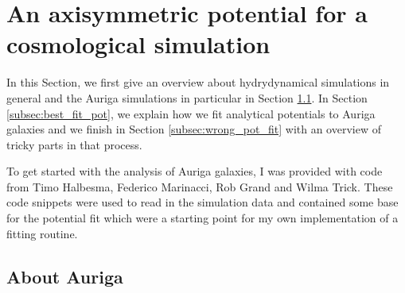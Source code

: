 \section{An axisymmetric potential for a cosmological simulation}\label{sec:Auriga}
In this Section, we first give an overview about hydrydynamical simulations in general and the Auriga simulations in particular in Section \ref{subsec:auriga}. In Section \ref{subsec:best_fit_pot}, we explain how we fit analytical potentials to Auriga galaxies and we finish in Section \ref{subsec:wrong_pot_fit} with an overview of tricky parts in that process.

To get started with the analysis of Auriga galaxies, I was provided with code from Timo Halbesma, Federico Marinacci, Rob Grand and Wilma Trick. These code snippets were used to read in the simulation data and contained some base for the potential fit which were a starting point for my own implementation of a fitting routine. 

\subsection{About Auriga}\label{subsec:auriga}
